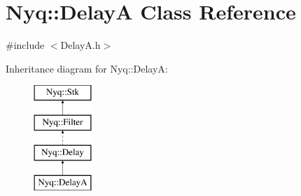 \hypertarget{class_nyq_1_1_delay_a}{}\section{Nyq\+:\+:DelayA Class Reference}
\label{class_nyq_1_1_delay_a}


{\ttfamily \#include $<$Delay\+A.\+h$>$}

Inheritance diagram for Nyq\+:\+:DelayA\+:\begin{figure}[H]
\begin{center}
\leavevmode
\includegraphics[height=4.000000cm]{class_nyq_1_1_delay_a}
\end{center}
\end{figure}
